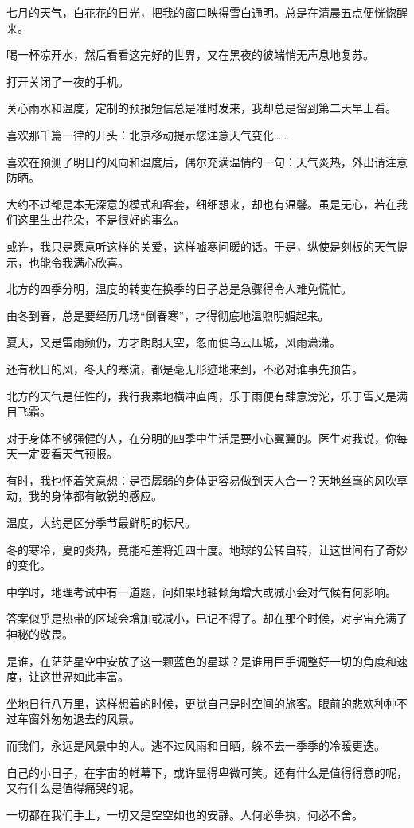 		\vspace{2em}
		七月的天气，白花花的日光，把我的窗口映得雪白通明。总是在清晨五点便恍惚醒来。\par
		喝一杯凉开水，然后看看这完好的世界，又在黑夜的彼端悄无声息地复苏。\par
		打开关闭了一夜的手机。\par
		关心雨水和温度，定制的预报短信总是准时发来，我却总是留到第二天早上看。\par
		喜欢那千篇一律的开头：北京移动提示您注意天气变化……\par
		喜欢在预测了明日的风向和温度后，偶尔充满温情的一句：天气炎热，外出请注意防晒。\par
		大约不过都是本无深意的模式和客套，细细想来，却也有温馨。虽是无心，若在我们这里生出花朵，不是很好的事么。\par
		或许，我只是愿意听这样的关爱，这样嘘寒问暖的话。于是，纵使是刻板的天气提示，也能令我满心欣喜。

		\vspace{1em}
		北方的四季分明，温度的转变在换季的日子总是急骤得令人难免慌忙。\par
		由冬到春，总是要经历几场“倒春寒”，才得彻底地温煦明媚起来。\par
		夏天，又是雷雨频仍，方才朗朗天空，忽而便乌云压城，风雨潇潇。\par
		还有秋日的风，冬天的寒流，都是毫无形迹地来到，不必对谁事先预告。\par
		北方的天气是任性的，我行我素地横冲直闯，乐于雨便有肆意滂沱，乐于雪又是满目飞霜。\par
		对于身体不够强健的人，在分明的四季中生活是要小心翼翼的。医生对我说，你每天一定要看天气预报。\par
		有时，我也怀着笑意想：是否孱弱的身体更容易做到天人合一？天地丝毫的风吹草动，我的身体都有敏锐的感应。

		\vspace{1em}
		温度，大约是区分季节最鲜明的标尺。\par
		冬的寒冷，夏的炎热，竟能相差将近四十度。地球的公转自转，让这世间有了奇妙的变化。\par
		中学时，地理考试中有一道题，问如果地轴倾角增大或减小会对气候有何影响。\par
		答案似乎是热带的区域会增加或减小，已记不得了。却在那个时候，对宇宙充满了神秘的敬畏。\par
		是谁，在茫茫星空中安放了这一颗蓝色的星球？是谁用巨手调整好一切的角度和速度，让这世界如此丰富。\par
		坐地日行八万里，这样想着的时候，更觉自己是时空间的旅客。眼前的悲欢种种不过车窗外匆匆退去的风景。\par
		而我们，永远是风景中的人。逃不过风雨和日晒，躲不去一季季的冷暖更迭。\par
		自己的小日子，在宇宙的帷幕下，或许显得卑微可笑。还有什么是值得得意的呢，又有什么是值得痛哭的呢。\par
		一切都在我们手上，一切又是空空如也的安静。人何必争执，何必不舍。

